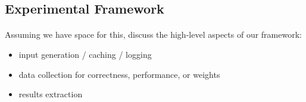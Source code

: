 \subsection{Experimental Framework}
\label{sec:deep:framework}

\paragraph{}
Assuming we have space for this, discuss the high-level aspects of our
framework:
\begin{itemize}
  \item input generation / caching / logging
  \item data collection for correctness, performance, or weights
  \item results extraction
\end{itemize}
